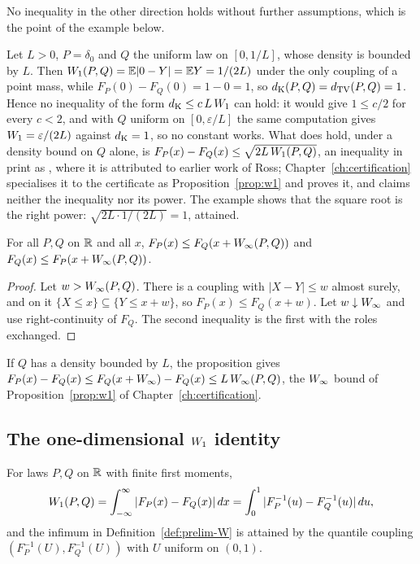 \documentclass[../../../main.tex]{subfiles}
\begin{document}
No inequality in the other direction holds without further assumptions, which is the point of the example below.

\begin{example}\label{ex:prelim-w1-dk}
Let $L>0$, $P=\delta_0$ and $Q$ the uniform law on $[0,1/L]$, whose density is bounded by $L$. Then $W_1(P,Q)=\mathbb{E}|0-Y|=\mathbb{E} Y=1/(2L)$ under the only coupling of a point mass, while $F_P(0)-F_Q(0)=1-0=1$, so $d_{\mathrm{K}}(P,Q)=d_{\mathrm{TV}}(P,Q)=1$. Hence no inequality of the form $d_{\mathrm{K}}\le c\,L\,W_1$ can hold: it would give $1\le c/2$ for every $c<2$, and with $Q$ uniform on $[0,\varepsilon/L]$ the same computation gives $W_1=\varepsilon/(2L)$ against $d_{\mathrm{K}}=1$, so no constant works. What does hold, under a density bound on $Q$ alone, is $F_P(x)-F_Q(x)\le\sqrt{2L\,W_1(P,Q)}$, an inequality in print as \cite[Prop.~1, p.~4]{xu2025}, where it is attributed to earlier work of Ross; Chapter~\ref{ch:certification} specialises it to the certificate as Proposition~\ref{prop:w1} and proves it, and claims neither the inequality nor its power. The example shows that the square root is the right power: $\sqrt{2L\cdot1/(2L)}=1$, attained.
\end{example}

\begin{proposition}\label{prop:prelim-winf-shift}
For all $P,Q$ on $\mathbb{R}$ and all $x$, $F_P(x)\le F_Q(x+W_\infty(P,Q))$ and $F_Q(x)\le F_P(x+W_\infty(P,Q))$.
\end{proposition}

\begin{proof}
Let $w>W_\infty(P,Q)$. There is a coupling with $|X-Y|\le w$ almost surely, and on it $\{X\le x\}\subseteq\{Y\le x+w\}$, so $F_P(x)\le F_Q(x+w)$. Let $w\downarrow W_\infty$ and use right-continuity of $F_Q$. The second inequality is the first with the roles exchanged.
\end{proof}

If $Q$ has a density bounded by $L$, the proposition gives $F_P(x)-F_Q(x)\le F_Q(x+W_\infty)-F_Q(x)\le L\,W_\infty(P,Q)$, the $W_\infty$ bound of Proposition~\ref{prop:w1} of Chapter~\ref{ch:certification}.

\subsection{The one-dimensional $W_1$ identity}

\begin{theorem}\label{thm:prelim-w1-identity}
For laws $P,Q$ on $\mathbb{R}$ with finite first moments,
\begin{equation}\label{eq:prelim-w1-identity}
W_1(P,Q)=\int_{-\infty}^{\infty}|F_P(x)-F_Q(x)|\,dx=\int_0^1|F_P^{-1}(u)-F_Q^{-1}(u)|\,du,
\end{equation}
and the infimum in Definition~\ref{def:prelim-W} is attained by the quantile coupling $(F_P^{-1}(U),F_Q^{-1}(U))$ with $U$ uniform on $(0,1)$.
\end{theorem}
\end{document}

